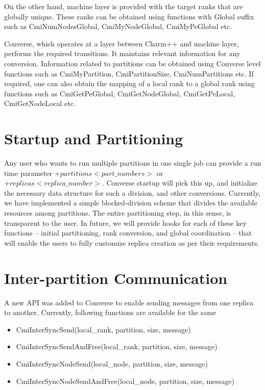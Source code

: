 On the other hand, machine layer is provided with the target ranks that
are globally unique. These ranks can be obtained using functions with Global
suffix such as CmiNumNodesGlobal, CmiMyNodeGlobal, CmiMyPeGlobal etc.

Converse, which operates at a layer between Charm++ and machine layer,
performs the required transitions. It maintains relevant information for any
conversion. Information related to partitions can be obtained using Converse
level functions such as CmiMyPartition, CmiPartitionSize, CmiNumPartitions
etc. If required, one can also obtain the mapping of a local rank to a global
rank using functions such as CmiGetPeGlobal, CmiGetNodeGlobal,  CmiGetPeLocal,
CmiGetNodeLocal etc.       


\section{Startup and Partitioning}

Any user who wants to run multiple partitions in one single job can provide a
run time parameter $+partitions <part\_numbers>$ or $+replicas <replica\_number>$.
Converse startup will pick this up, and initialize the necessary data
structure for such a division, and other conversions.  Currently, we have
implemented a simple blocked-division scheme that divides the available
resources among partitions. The entire partitioning step, in this sense, is
transparent to the user. In future, we will provide hooks for each of these
key functions – initial partitioning, rank conversion, and global coordination
– that will enable the users to fully customize replica creation as per their
requirements.

\section{Inter-partition Communication}

A new API was added to Converse to enable sending messages from one replica to
another. Currently, following functions are available for the same
\begin{itemize}
\item CmiInterSyncSend(local\_rank, partition, size, message)        
\item CmiInterSyncSendAndFree(local\_rank, partition, size, message)
\item CmiInterSyncNodeSend(local\_node, partition, size, message)        
\item CmiInterSyncNodeSendAndFree(local\_node, partition, size, message)
\end{itemize}

